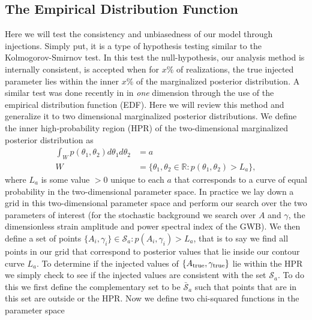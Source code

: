 \documentclass[iop]{emulateapj}
\newcommand{\be}{\begin{equation}}
\newcommand{\ee}{\end{equation}}
\begin{document}


\subsection{The Empirical Distribution Function}
\label{sec:edf}

Here we will test the consistency and unbiasedness  of our model through injections. Simply put,
it is a type of hypothesis testing similar to the Kolmogorov-Smirnov test. In
this test the
null-hypothesis, our analysis method is internally consistent, is accepted when for
$x$\% of realizations, the true injected parameter lies within the inner $x$\% of the marginalized posterior distribution. A similar test was done recently in \cite{vhl12} in \emph{one} dimension through the use of the empirical distribution function (EDF). Here we will review this method and generalize it to two dimensional marginalized posterior distributions. We define the inner high-probability region (HPR) of the two-dimensional marginalized posterior distribution as
\be
\begin{split}
\int_{W}p(\theta_{1},\theta_{2})d\theta_{1}d\theta_{2}&=a\\
W&=\{ \theta_{1},\theta_{2}\in \mathbb{R} : p(\theta_{1},\theta_{2})>L_{a}\},
\label{eq:hpr}
\end{split}
\ee
where $L_{a}$ is some value $>0$ unique to each $a$ that corresponds to a curve of equal probability in the two-dimensional parameter space. In practice we lay down a grid in this two-dimensional parameter space and perform our search over the two parameters of interest (for the stochastic background we search over $A$ and $\gamma$, the dimensionless strain amplitude and power spectral index of the GWB). We then define a set of points $\{A_{i},\gamma_{i}\}\in \mathcal{S}_{a} : p(A_{i},\gamma_{i})>L_{a}$, that is to say we find all points in our grid that correspond to posterior values that lie inside our contour curve $L_{a}$. To determine if the injected values of $\{A_{\rm true},\gamma_{\rm true}\}$ lie within the HPR we simply check to see if the injected values are consistent with the set $\mathcal{S}_{a}$. To do this we first define the complementary set to be $\bar{\mathcal{S}}_{a}$ such that points that are in this set are outside or the HPR. Now we define two chi-squared functions in the parameter space
\end{document}
